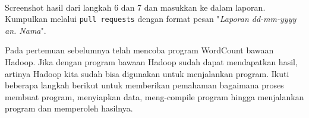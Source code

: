 \documentclass[a4paper]{tufte-handout}
\begin{document}
 \\
Screenshot hasil dari langkah 6 dan 7 dan masukkan ke dalam laporan. Kumpulkan melalui {\tt pull requests} dengan format pesan "\textit{Laporan dd-mm-yyyy an. Nama}".

\hrulefill

\clearpage
{}


Pada pertemuan sebelumnya telah mencoba program WordCount bawaan Hadoop. Jika dengan program bawaan Hadoop sudah dapat mendapatkan hasil, artinya Hadoop kita sudah bisa digunakan untuk menjalankan program. Ikuti beberapa langkah berikut untuk memberikan pemahaman bagaimana proses membuat program, menyiapkan data, meng-compile program hingga menjalankan program dan memperoleh hasilnya.
\end{document}
